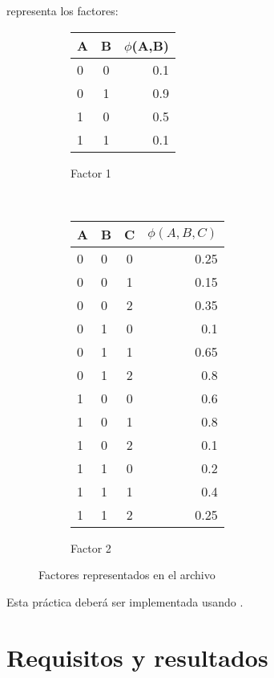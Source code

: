 \noindent representa los factores:\par

\begin{figure}[H]
    \centering
    \begin{subfigure}[b]{0.4\textwidth}
        \centering
        \begin{tabular}{ l  c | r }
          A & B & $\phi$(A,B)\\ \hline
          0 & 0 & 0.1  \\ \hline
          0 & 1 & 0.9  \\ \hline
          1 & 0 & 0.5  \\ \hline
          1 & 1 & 0.1  \\
        \end{tabular}
        \caption{Factor 1}
    \end{subfigure}
    ~ 
    \begin{subfigure}[b]{0.4\textwidth}
        \centering
        \begin{tabular}{ l l  c | r }
          A & B & C &  \(\phi(A,B,C)\)\\ \hline
          0 & 0 & 0 & 0.25  \\ \hline
          0 & 0 & 1 & 0.15  \\ \hline
          0 & 0 & 2 & 0.35  \\ \hline
          0 & 1 & 0 & 0.1  \\ \hline
          0 & 1 & 1 & 0.65  \\ \hline
          0 & 1 & 2 & 0.8 \\ \hline
          1 & 0 & 0 & 0.6  \\ \hline
          1 & 0 & 1 & 0.8  \\ \hline
          1 & 0 & 2 & 0.1  \\ \hline
          1 & 1 & 0 & 0.2  \\ \hline
          1 & 1 & 1 & 0.4  \\ \hline
          1 & 1 & 2 & 0.25 \\
        \end{tabular}
        \caption{Factor 2}
    \end{subfigure}
    \caption{Factores representados en el archivo}
\end{figure}


\noindent Esta práctica deberá ser implementada usando .

\section{Requisitos y resultados}

